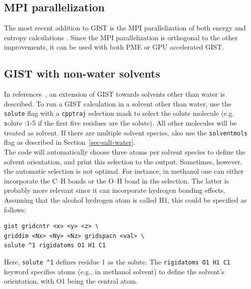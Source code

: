 \documentclass[9pt,tutorial]{livecoms}
\newcommand{\software}{\texttt}
\newcommand\inlinecode{\texttt}
\begin{document}
\subsection{MPI parallelization}
The most recent addition to GIST is the MPI parallelization of both energy and entropy calculations \cite{Roe2023-mpi-gist}.
Since the MPI parallelization is orthogonal to the other improvements, it can be used with both PME or GPU accelerated GIST.
\subsection{GIST with non-water solvents}
In references~\cite{Kraml2020,Kamenik2020-gist-macrocycles,Waibl2022-gist-solvents}, an extension of GIST towards solvents other than water is described.
To run a GIST calculation in a solvent other than water, use the \inlinecode{solute} flag with a \software{cpptraj} selection mask to select the solute molecule (e.g. \inlinecode solute :1-5 if the first five residues are the solute).
All other molecules will be treated as solvent.
If there are multiple solvent species, also use the \inlinecode{solventmols} flag as described in Section~\ref{sec-salt-water}. \\
The code will automatically choose three atoms per solvent species to define the solvent orientation, and print this selection to the output.
Sometimes, however, the automatic selection is not optimal.
For instance, in methanol one can either incorporate the C--H bonds or the O--H bond in the selection.
The latter is probably more relevant since it can incorporate hydrogen bonding effects.
Assuming that the alcohol hydrogen atom is called H1, this could be specified as follows:

\begin{lstlisting}[style=cpptraj]
gist gridcntr <x> <y> <z> \
griddim <Nx> <Ny> <Nz> gridspacn <val> \
solute ^1 rigidatoms O1 H1 C1
\end{lstlisting}
Here, \inlinecode{solute \^{}1} defines residue 1 as the solute. 
The \inlinecode{rigidatoms O1 H1 C1} keyword specifies atoms (e.g., in methanol solvent) to define the solvent's orientation, with O1 being the central atom.
\end{document}
